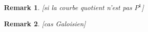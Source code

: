 \documentclass[10pt]{article}
\newtheorem{rq1}{Remark}[]
\newcommand{\s}{\vspace{0.3cm}}
\begin{document}
\s

\begin{rq1} \rm \color{red} [si la courbe quotient n'est pas $P^1$] \color{black}

\end{rq1}

\s

\begin{rq1} \rm \color{red} [cas Galoisien] \color{black}

\end{rq1}














\newpage
\vspace*{1cm}
\end{document}
